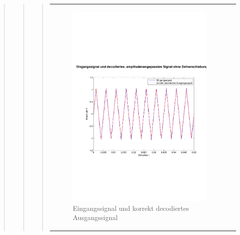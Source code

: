 \begin{quote}
\begin{quote}
\begin{quote}
\begin{center}
\begin{tabular}{ll}
                    \begin{minipage}{0.6\textwidth}
                        \begin{figure}[H]
                            \includegraphics[scale=0.4, trim = 0cm 7cm 0cm
                            7.5cm, clip]
                            {./Bilder/drei100_Eingang_vs_korrektDecodiert}
                              \caption{Eingangssignal und korrekt decodiertes
                              Ausgangssignal}
                        \end{figure}
                    \end{minipage}
                
                \end{tabular}
            \end{center}
            
            
            

\end{quote}
\end{quote}
\end{quote}
